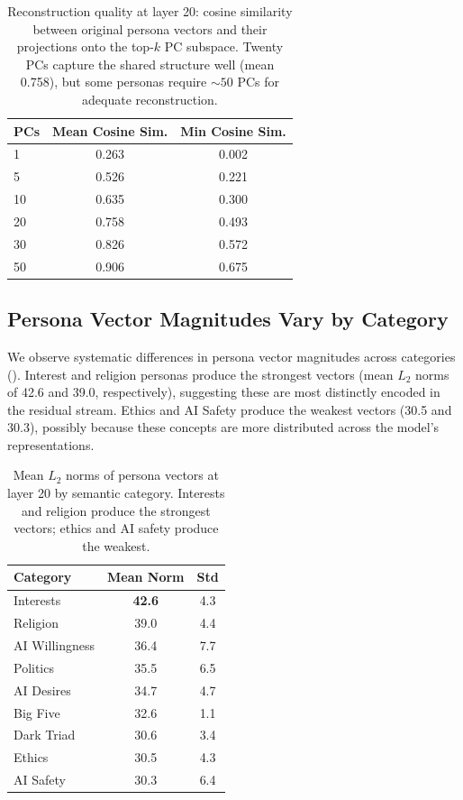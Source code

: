 \begin{table}[t]
    \centering
    \caption{Reconstruction quality at layer 20: cosine similarity between original persona vectors and their projections onto the top-$k$ PC subspace. Twenty PCs capture the shared structure well (mean 0.758), but some personas require ${\sim}50$ PCs for adequate reconstruction.}
    \begin{tabular}{@{}lcc@{}}
        \toprule
        \textbf{PCs} & \textbf{Mean Cosine Sim.} & \textbf{Min Cosine Sim.} \\
        \midrule
        1  & 0.263 & 0.002 \\
        5  & 0.526 & 0.221 \\
        10 & 0.635 & 0.300 \\
        20 & 0.758 & 0.493 \\
        30 & 0.826 & 0.572 \\
        50 & 0.906 & 0.675 \\
        \bottomrule
    \end{tabular}
    \label{tab:reconstruction}
\end{table}

\subsection{Persona Vector Magnitudes Vary by Category}
\label{sec:results_norms}

We observe systematic differences in persona vector magnitudes across categories (). Interest and religion personas produce the strongest vectors (mean $L_2$ norms of 42.6 and 39.0, respectively), suggesting these are most distinctly encoded in the residual stream. Ethics and AI Safety produce the weakest vectors (30.5 and 30.3), possibly because these concepts are more distributed across the model's representations.

\begin{table}[t]
    \centering
    \caption{Mean $L_2$ norms of persona vectors at layer 20 by semantic category. Interests and religion produce the strongest vectors; ethics and AI safety produce the weakest.}
    \begin{tabular}{@{}lcc@{}}
        \toprule
        \textbf{Category} & \textbf{Mean Norm} & \textbf{Std} \\
        \midrule
        Interests & \textbf{42.6} & 4.3 \\
        Religion & 39.0 & 4.4 \\
        AI Willingness & 36.4 & 7.7 \\
        Politics & 35.5 & 6.5 \\
        AI Desires & 34.7 & 4.7 \\
        Big Five & 32.6 & 1.1 \\
        Dark Triad & 30.6 & 3.4 \\
        Ethics & 30.5 & 4.3 \\
        AI Safety & 30.3 & 6.4 \\
        \bottomrule
    \end{tabular}
    \label{tab:norms}
\end{table}

